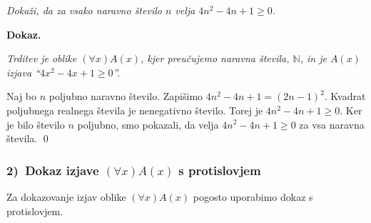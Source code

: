 \documentclass[11pt,paper=b5,footinclude,headinclude]{scrbook} %
\newcounter{example}
\begin{document}
\medskip
\begin{example*}
\emph{ Dokaži, da za vsako naravno število $n$ velja $4n^2-4n+1\ge 0$.
}

\medskip \noindent\textbf{ Dokaz.}

\emph{ Trditev je oblike $(\forall x)A(x)$, kjer preučujemo naravna števila, $\mathbb{N}$, in je $A(x)$ izjava ``$4x^2 -4x+1 \ge 0$''.}

Naj bo $n$ poljubno naravno število. Zapišimo $4n^2 -4n+1 = (2n-1)^2$.
Kvadrat poljubnega realnega števila je nenegativno število.
Torej je $4n^2 -4n+1\ge 0$. Ker je bilo število $n$ poljubno, smo pokazali, da velja
 $4n^2-4n+1\ge 0$ za vsa naravna števila.
\qed
\end{example*}
\medskip
\begin{center}
\end{center}


\subsubsection*{2)~Dokaz izjave $(\forall x)A(x)$ s protislovjem}

Za dokazovanje izjav oblike $(\forall x)A(x)$  pogosto uporabimo dokaz s protislovjem.
\end{document}
